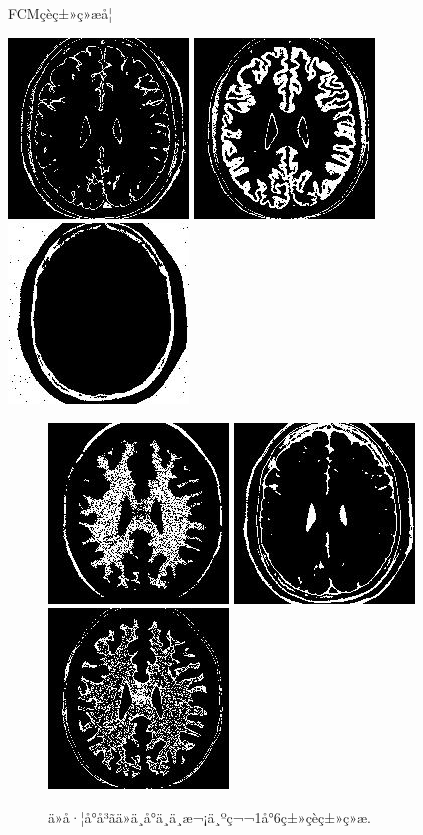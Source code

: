 \documentclass[lang=cn,11pt]{elegantpaper}
\begin{document}
FCMçèç±»ç»æå¦ 
\begin{center}
    \includegraphics[width=.25\textwidth]{Brain/FCM/2020-03-19_21-07-36Kind1.jpg}
    \includegraphics[width=.25\textwidth]{Brain/FCM/2020-03-19_21-07-36Kind2.jpg}
    \includegraphics[width=.25\textwidth]{Brain/FCM/2020-03-19_21-07-36Kind3.jpg}
\end{center}
\begin{figure}[ht]
    \centering
    \includegraphics[width=.25\textwidth]{Brain/FCM/2020-03-19_21-07-36Kind4.jpg}
    \includegraphics[width=.25\textwidth]{Brain/FCM/2020-03-19_21-07-36Kind5.jpg}
    \includegraphics[width=.25\textwidth]{Brain/FCM/2020-03-19_21-07-36Kind6.jpg}
    \caption{ä»å·¦å°å³ãä»ä¸å°ä¸ä¸æ¬¡ä¸ºç¬¬1å°6ç±»çèç±»ç»æ. \label{fig:FCM}}
\end{figure}
\end{document}
